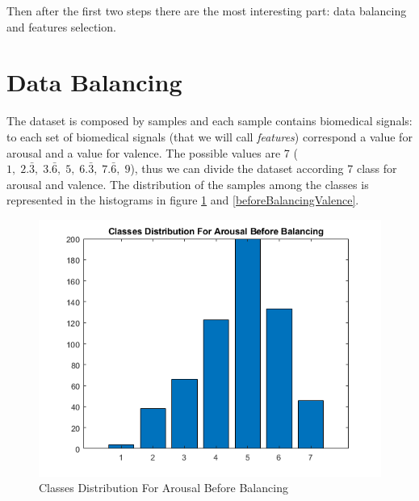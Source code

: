 \documentclass[a4paper]{report}
\begin{document}
	\noindent Then after the first two steps there are the most interesting part: data balancing and features selection.
	
	\newpage
	\section{Data Balancing}
	\noindent The dataset is composed by samples and each sample contains biomedical signals: to each set of biomedical signals (that we will call \textit{features}) correspond a value for arousal and a value for valence. The possible values are 7 ($1,\; 2.\bar3,\; 3.\bar6,\; 5,\; 6.\bar3,\; 7.\bar6,\; 9$), thus we can divide the dataset according 7 class for arousal and valence. The distribution of the samples among the classes is represented in the histograms in figure \ref{beforeBalancingArousal} and \ref{beforeBalancingValence}.
	
	\begin{figure}[htpb]
		\centering
		\includegraphics[scale=0.7]{img/beforeBalancingArousal.png}
		\caption{Classes Distribution For Arousal Before Balancing}
		\label{beforeBalancingArousal}
	\end{figure}  
\end{document}
